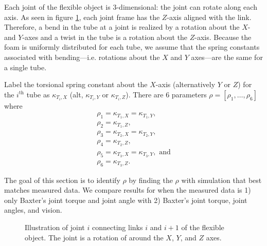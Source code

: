 \documentclass[runningheads,a4paper]{llncs}
\begin{document}
Each joint of the flexible object is 3-dimensional: the joint can rotate along each axis. As seen in figure \ref{fig-tube_link}, each joint frame has the $Z$-axis aligned with the link. Therefore, a bend in the tube at a joint is realized by a rotation about the $X$- and $Y$-axes and a twist in the tube is a rotation about the $Z$-axis. Because the foam is uniformly distributed for each tube, we assume that the spring constants associated with bending---i.e. rotations about the $X$ and $Y$ axes---are the same for a single tube. 

Label the torsional spring constant about the $X$-axis (alternatively $Y$ or $Z$) for the $i^{\textrm{th}}$ tube as $\kappa_{T_i,X}$ (alt, $\kappa_{T_i,Y}$ or $\kappa_{T_i,Z}$). There are 6 parameters $\rho = [\rho_1,\ldots,\rho_6]$ where 
\begin{equation}
\begin{array}{l}
\rho_1 = \kappa_{T_1,X} = \kappa_{T_1,Y}, \\
\rho_2 = \kappa_{T_1,Z}, \\
\rho_3 = \kappa_{T_2,X} = \kappa_{T_2,Y}, \\
\rho_4 = \kappa_{T_2,Z} , \\
\rho_5 = \kappa_{T_3,X} = \kappa_{T_3,Y}, \textrm{ and} \\
\rho_6 = \kappa_{T_3,Z}. 
\end{array}
\label{eq-params}
\end{equation}

The goal of this section is to identify $\rho$ by finding the $\rho$ with simulation that best matches measured data.  We compare results for when the measured data is 1) only Baxter's joint torque and joint angle with 2) Baxter's joint torque, joint angles, and vision.

\begin{figure}[!htb]
\centering
\def\svgwidth{.80\textwidth}%

\caption{Illustration of joint $i$ connecting links $i$ and $i+1$ of the flexible object.  The joint is a rotation of around the $X$, $Y$, and $Z$ axes.}
\label{fig-tube_link}
\end{figure}
\end{document}
